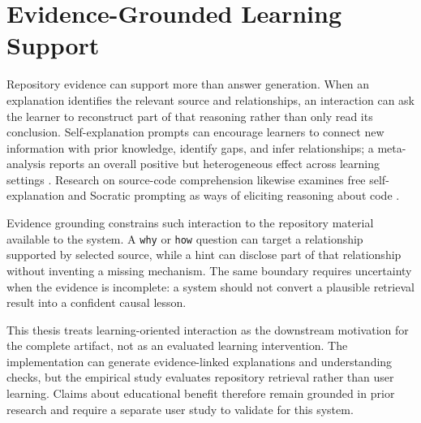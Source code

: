 \section{Evidence-Grounded Learning Support}\label{sec:evidence-grounded-learning-support}

Repository evidence can support more than answer generation. When an explanation identifies the relevant source and relationships, an interaction can ask the learner to reconstruct part of that reasoning rather than only read its conclusion. Self-explanation prompts can encourage learners to connect new information with prior knowledge, identify gaps, and infer relationships; a meta-analysis reports an overall positive but heterogeneous effect across learning settings \cite{Bisra2018SelfExplanation}. Research on source-code comprehension likewise examines free self-explanation and Socratic prompting as ways of eliciting reasoning about code \cite{Tamang2021Socratic}.

Evidence grounding constrains such interaction to the repository material available to the system. A \texttt{why} or \texttt{how} question can target a relationship supported by selected source, while a hint can disclose part of that relationship without inventing a missing mechanism. The same boundary requires uncertainty when the evidence is incomplete: a system should not convert a plausible retrieval result into a confident causal lesson.

This thesis treats learning-oriented interaction as the downstream motivation for the complete artifact, not as an evaluated learning intervention. The implementation can generate evidence-linked explanations and understanding checks, but the empirical study evaluates repository retrieval rather than user learning. Claims about educational benefit therefore remain grounded in prior research and require a separate user study to validate for this system.
